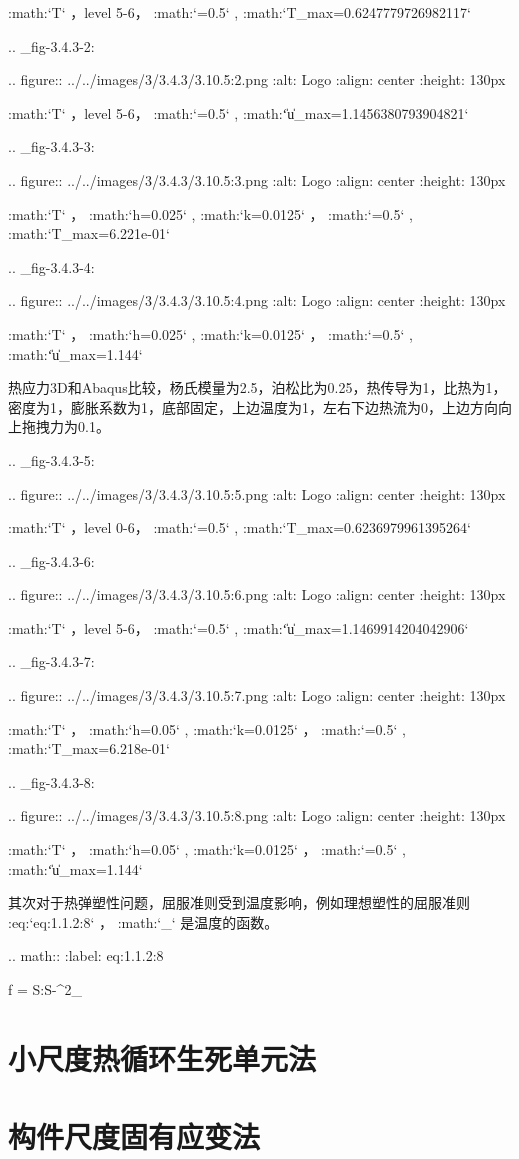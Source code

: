    :math:`T` ，level 5-6， :math:`=0.5` , :math:`T_{max}=0.6247779726982117`

.. _fig-3.4.3-2:

.. figure:: ../../images/3/3.4.3/3.10.5:2.png
   :alt: Logo
   :align: center
   :height: 130px

   :math:`T` ，level 5-6， :math:`=0.5` , :math:`\|\mathbf u\|_{max}=1.1456380793904821`

.. _fig-3.4.3-3:

.. figure:: ../../images/3/3.4.3/3.10.5:3.png
   :alt: Logo
   :align: center
   :height: 130px

   :math:`T` ， :math:`h=0.025` , :math:`k=0.0125` ， :math:`=0.5` , :math:`T_{max}=6.221\mathrm e-01`
	   
.. _fig-3.4.3-4:

.. figure:: ../../images/3/3.4.3/3.10.5:4.png
   :alt: Logo
   :align: center
   :height: 130px

   :math:`T` ， :math:`h=0.025` , :math:`k=0.0125` ， :math:`=0.5` , :math:`\|\mathbf u\|_{max}=1.144`

热应力3D和Abaqus比较，杨氏模量为2.5，泊松比为0.25，热传导为1，比热为1，密度为1，膨胀系数为1，底部固定，上边温度为1，左右下边热流为0，上边方向向上拖拽力为0.1。  

.. _fig-3.4.3-5:

.. figure:: ../../images/3/3.4.3/3.10.5:5.png
   :alt: Logo
   :align: center
   :height: 130px
	    
   :math:`T` ，level 0-6， :math:`=0.5` , :math:`T_{max}=0.6236979961395264`

.. _fig-3.4.3-6:

.. figure:: ../../images/3/3.4.3/3.10.5:6.png
   :alt: Logo
   :align: center
   :height: 130px

   :math:`T` ，level 5-6， :math:`=0.5` , :math:`\|\mathbf u\|_{max}=1.1469914204042906`

.. _fig-3.4.3-7:

.. figure:: ../../images/3/3.4.3/3.10.5:7.png
   :alt: Logo
   :align: center
   :height: 130px

   :math:`T` ， :math:`h=0.05` , :math:`k=0.0125` ， :math:`=0.5` , :math:`T_{max}=6.218\mathrm e-01`
	   
.. _fig-3.4.3-8:

.. figure:: ../../images/3/3.4.3/3.10.5:8.png
   :alt: Logo
   :align: center
   :height: 130px

   :math:`T` ， :math:`h=0.05` , :math:`k=0.0125` ， :math:`=0.5` , :math:`\|\mathbf u\|_{max}=1.144`

其次对于热弹塑性问题，屈服准则受到温度影响，例如理想塑性的屈服准则 :eq:`eq:1.1.2:8` ， :math:`\sigma_\theta` 是温度的函数。

.. math::
   :label: eq:1.1.2:8
	   
   f = \mathbf S:\mathbf S-\sigma^2_\theta
\fi
\section{小尺度热循环生死单元法}

\section{构件尺度固有应变法}
